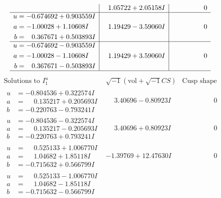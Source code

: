 \documentclass[1p]{elsarticle_modified}
\theoremstyle{definition}
\newcommand{\I}{\sqrt{-1}}
\begin{document}
$$\begin{array}{c|c|c}
 & \phantom{-}1.05722 + 2.05158 I & \phantom{-0.000000 } 0 \\ \hline\begin{aligned}
u &= -0.674692 + 0.903559 I \\
a &= -1.00028 + 1.10608 I \\
b &= \phantom{-}0.367671 + 0.503893 I\end{aligned}
 & \phantom{-}1.19429 - 3.59060 I & \phantom{-0.000000 } 0 \\ \hline\begin{aligned}
u &= -0.674692 - 0.903559 I \\
a &= -1.00028 - 1.10608 I \\
b &= \phantom{-}0.367671 - 0.503893 I\end{aligned}
 & \phantom{-}1.19429 + 3.59060 I & \phantom{-0.000000 } 0\\
 \hline 
 \end{array}$$\newpage$$\begin{array}{c|c|c}  
\text{Solutions to }I^u_{1}& \I (\text{vol} + \sqrt{-1}CS) & \text{Cusp shape}\\
 \hline 
\begin{aligned}
u &= -0.804536 + 0.322574 I \\
a &= \phantom{-}0.135217 + 0.205693 I \\
b &= -0.220763 - 0.793241 I\end{aligned}
 & \phantom{-}3.40696 - 0.80923 I & \phantom{-0.000000 } 0 \\ \hline\begin{aligned}
u &= -0.804536 - 0.322574 I \\
a &= \phantom{-}0.135217 - 0.205693 I \\
b &= -0.220763 + 0.793241 I\end{aligned}
 & \phantom{-}3.40696 + 0.80923 I & \phantom{-0.000000 } 0 \\ \hline\begin{aligned}
u &= \phantom{-}0.525133 + 1.006770 I \\
a &= \phantom{-}1.04682 + 1.85118 I \\
b &= -0.715632 + 0.566799 I\end{aligned}
 & -1.39769 + 12.47630 I & \phantom{-0.000000 } 0 \\ \hline\begin{aligned}
u &= \phantom{-}0.525133 - 1.006770 I \\
a &= \phantom{-}1.04682 - 1.85118 I \\
b &= -0.715632 - 0.566799 I\end{aligned}

\end{array}$$
\end{document}

